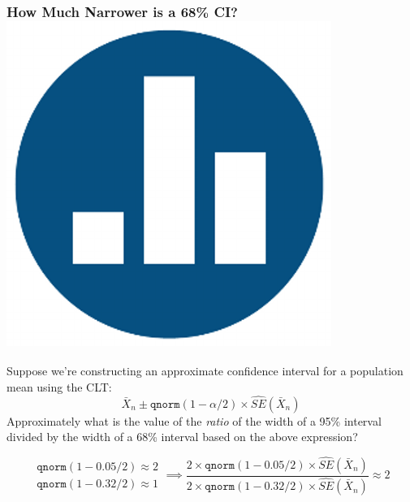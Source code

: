 \documentclass[handout]{beamer}
\begin{document}
\begin{frame}
\frametitle{How Much Narrower is a 68\% CI? \hfill \includegraphics[scale = 0.05]{./images/clicker}}

Suppose we're constructing an approximate confidence interval for a population mean using the  CLT:
	$$\bar{X}_n \pm \texttt{qnorm}(1 - \alpha /2) \times \widehat{SE}(\bar{X}_n)$$
Approximately what is the value of the \emph{ratio} of the width of a 95\% interval divided by the width of a 68\% interval based on the above expression?

\vspace{2em}


\pause

\small

\alert{$$
\boxed{\begin{array}{r}
	\texttt{qnorm}(1 - 0.05/2) \approx 2  \\
	\texttt{qnorm}(1 - 0.32/2)  \approx 1
\end{array}} \implies 
\frac{2\times \texttt{qnorm}(1 - 0.05/2) \times \widehat{SE}(\bar{X}_n) }{2\times \texttt{qnorm}(1 - 0.32/2) \times \widehat{SE}(\bar{X}_n)}\approx 2
$$}

\end{frame}

\end{document}
